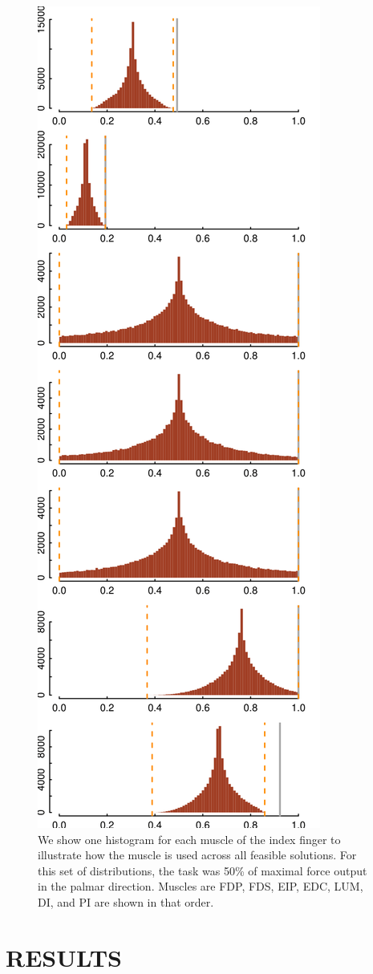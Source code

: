 \begin{figure}[htbp]
\centering
\includegraphics[width=7.5cmh]{sections/figs/raw_histograms.png}
\caption{We show one histogram for each muscle of the index finger to illustrate how the muscle is used across all feasible solutions.
For this set of distributions, the task was 50\% of maximal force output in the palmar direction. Muscles are FDP, FDS, EIP, EDC, LUM, DI, and PI are shown in that order.}
\label{fig:raw_histograms}
\end{figure}


\section{RESULTS}

